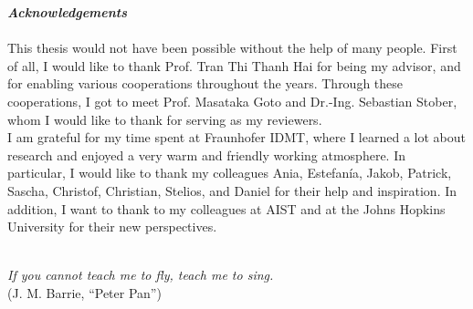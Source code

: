 
\newpage

\begin{verbatim}

\end{verbatim}

\textbf{\emph{Acknowledgements}}
\\\\

This thesis would not have been possible without the help of many people. First of all, I would like to thank Prof. Tran Thi Thanh Hai for being my advisor, and for enabling various cooperations throughout the years. Through these cooperations, I got to meet Prof. Masataka Goto and Dr.-Ing. Sebastian Stober, whom I would like to thank for serving as my reviewers.\\
I am grateful for my time spent at Fraunhofer IDMT, where I learned a lot about research and enjoyed a very warm and friendly working atmosphere. In particular, I would like to thank my colleagues Ania, Estefanía, Jakob, Patrick, Sascha, Christof, Christian, Stelios, and Daniel for their help and inspiration. In addition, I want to thank to my colleagues at AIST and at the Johns Hopkins University for their new perspectives.\\\\



\bigskip

\begin{flushright}
\textit{If you cannot teach me to fly, teach me to sing.}\\
(J. M. Barrie, ``Peter Pan'')
\end{flushright}




